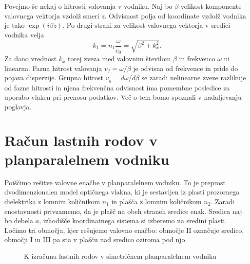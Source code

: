 Povejmo še nekaj o hitrosti valovanja v vodniku.
Naj bo $\beta$ velikost komponente valovnega vektorja vzdolž smeri $z$. Odvisnost polja
od koordinate vzdolž vodnika je tako $\exp (i\beta z)$. Po drugi strani za velikost
valovnega vektorja v sredici vodnika velja
\begin{equation}
k_1 = n_{1}\frac{\omega}{c_0}=\sqrt{\beta^{2}+k_{x}^{2}}
\label{9.0}.
\end{equation}
Za dano vrednost $k_{x}$ torej zveza med valovnim številom $\beta$
in frekvenco $\omega$ ni linearna. Fazna hitrost 
valovanja $v_{f}=\omega/\beta$ je
odvisna od frekvence in pride do pojava disperzije. Grupna 
hitrost $v_{g}=d\omega/d\beta$ 
se zaradi nelinearne zveze razlikuje od fazne hitrosti in njena frekvenčna odvisnost 
ima pomembne posledice za uporabo vlaken pri prenosu podatkov. Več o tem bomo spoznali 
v nadaljevanju poglavja. 

\section{Račun lastnih rodov v planparalelnem vodniku}
Poiščimo rešitve valovne enačbe v planparalelnem vodniku. 
To je preprost dvodimenzionalen model optičnega vlakna, ki je sestavljen iz 
plasti prozornega dielektrika z lomnim količnikom $n_1$ in plašča z lomnim količnikom $n_2$.
Zaradi enostavnosti privzamemo, da je plašč na obeh straneh sredice enak.
Sredica naj bo debela $a$, izhodišče koordinatnega sistema
si izberemo na sredini plasti. Ločimo tri območja, kjer rešujemo valovno enačbo:
območje II označuje sredico, območji I in III pa sta v plašču nad sredico oziroma pod njo. 

\begin{figure}[h]
\centering
\def\svgwidth{120truemm} 

\caption{K izračunu lastnih rodov v simetričnem planparalelnem vodniku}
\label{fig:vodnikracun}
\end{figure}

